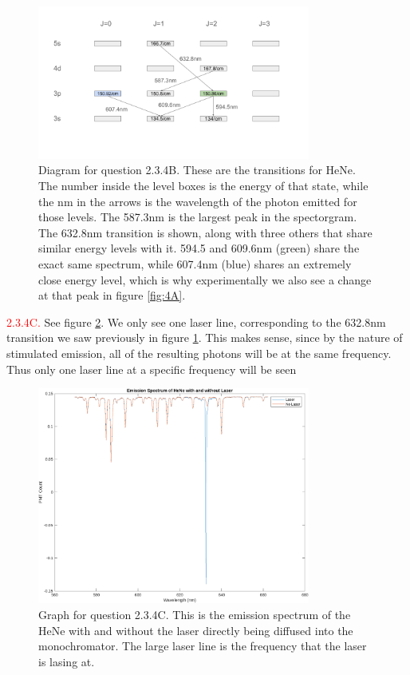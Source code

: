 \documentclass[letterpaper, reqno,11pt]{article}
\begin{document}
\begin{figure}[htpb]
    \centering
    \includegraphics[width=0.8\textwidth]{4B}
    \caption{Diagram for question 2.3.4B. These are the transitions for HeNe. The number inside the level boxes is the energy of that state, while the nm in the arrows is the wavelength of the photon emitted for those levels. The 587.3nm is the largest peak in the spectorgram. The 632.8nm transition is shown, along with three others that share similar energy levels with it. 594.5 and 609.6nm (green) share the exact same spectrum, while 607.4nm (blue) shares an extremely close energy level, which is why experimentally we also see a change at that peak in figure \ref{fig:4A}.}
    \label{fig:4B}
\end{figure}

\noindent \textcolor{red}{2.3.4C.} See figure \ref{fig:4C}. We only see one laser line, corresponding to the 632.8nm transition we saw previously in figure \ref{fig:4B}. This makes sense, since by the nature of stimulated emission, all of the resulting photons will be at the same frequency. Thus only one laser line at a specific frequency will be seen

\begin{figure}[htpb]
    \centering
    \includegraphics[width=0.8\textwidth]{4C}
    \caption{Graph for question 2.3.4C. This is the emission spectrum of the HeNe with and without the laser directly being diffused into the monochromator. The large laser line is the frequency that the laser is lasing at.}
    \label{fig:4C}
\end{figure}
\end{document}
